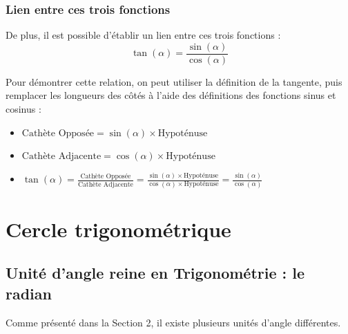 \documentclass[a4paper]{article}
\begin{document}
			\bigbreak
			\bigbreak
			\bigbreak
			\bigbreak
			\bigbreak
			\bigbreak



		\subsubsection{Lien entre ces trois fonctions} \label{lien_fct_trigo}

			De plus,
			il est possible d'établir un lien entre ces trois fonctions :
			{ \LARGE $$ \tan(\alpha) = \frac{\sin(\alpha)}{\cos(\alpha)} $$}

			\medbreak
			\medbreak

			Pour démontrer cette relation, 
			on peut utiliser la définition de la tangente, 
			puis remplacer les longueurs des côtés à l'aide 
			des définitions des fonctions sinus et cosinus :

			\medbreak

			\begin{itemize}
				\item [ ] $\text{Cathète Opposée}   = \sin(\alpha) \times \text{Hypoténuse}$
				\item [ ] $\text{Cathète Adjacente} = \cos(\alpha) \times \text{Hypoténuse}$
			\end{itemize}

			\bigbreak

			\begin{Large}
			\begin{itemize}
				\item [ ] $\tan(\alpha) = \frac{\text{Cathète Opposée}}{\text{Cathète Adjacente}} = \frac{\sin(\alpha) \times \text{Hypoténuse}}{\cos(\alpha) \times \text{Hypoténuse}} = \frac{\sin(\alpha)}{\cos(\alpha)}$
			\end{itemize}
			\end{Large}

\newpage

	\section{Cercle trigonométrique}

		\subsection{Unité d'angle reine en Trigonométrie : le radian}

			Comme présenté dans la Section 2, 
			il existe plusieurs unités d'angle différentes.
\end{document}
